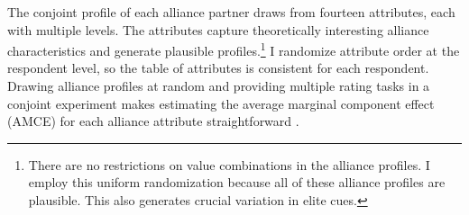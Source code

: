 \documentclass[12pt]{article}
\begin{document}
The conjoint profile of each alliance partner draws from fourteen attributes, each with multiple levels. 
The attributes capture theoretically interesting alliance characteristics and generate plausible profiles.\footnote{There are no restrictions on value combinations in the alliance profiles. I employ this uniform randomization because all of these alliance profiles are plausible. This also generates crucial variation in elite cues.}
I randomize attribute order at the respondent level, so the table of attributes is consistent for each respondent. 
Drawing alliance profiles at random and providing multiple rating tasks in a conjoint experiment makes estimating the average marginal component effect (AMCE) for each alliance attribute straightforward \citep{Hainmuelleretal2014}. 
\end{document}
